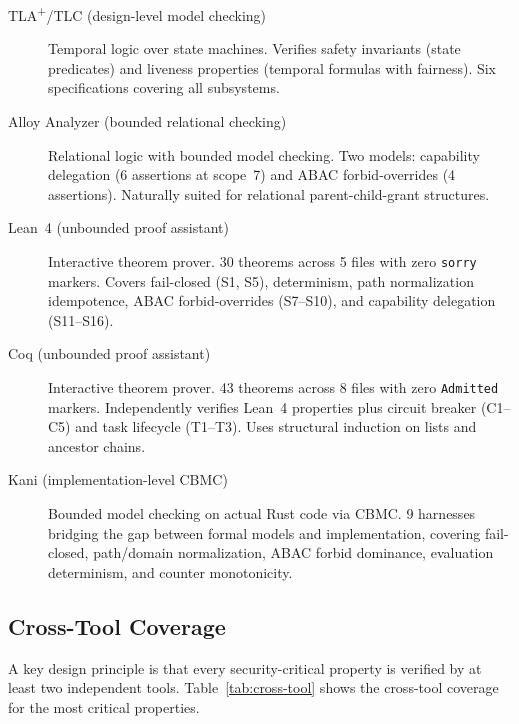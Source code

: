 \documentclass[sigplan,screen,nonacm]{acmart}
\newcommand{\tlaplus}{TLA\textsuperscript{+}\xspace}
\begin{document}
\begin{description}
  \item[\tlaplus/TLC (design-level model checking)] Temporal logic over
    state machines. Verifies safety invariants (state predicates) and
    liveness properties (temporal formulas with fairness). Six
    specifications covering all subsystems.
  \item[Alloy Analyzer (bounded relational checking)] Relational logic
    with bounded model checking. Two models: capability delegation (6
    assertions at scope~7) and ABAC forbid-overrides (4 assertions).
    Naturally suited for relational parent-child-grant structures.
  \item[Lean~4 (unbounded proof assistant)] Interactive theorem prover.
    30 theorems across 5 files with zero \texttt{sorry} markers. Covers
    fail-closed (S1, S5), determinism, path normalization idempotence,
    ABAC forbid-overrides (S7--S10), and capability delegation (S11--S16).
  \item[Coq (unbounded proof assistant)] Interactive theorem prover.
    43 theorems across 8 files with zero \texttt{Admitted} markers.
    Independently verifies Lean~4 properties plus circuit breaker (C1--C5)
    and task lifecycle (T1--T3). Uses structural induction on lists and
    ancestor chains.
  \item[Kani (implementation-level CBMC)] Bounded model checking on actual
    Rust code via CBMC. 9 harnesses bridging the gap between formal models
    and implementation, covering fail-closed, path/domain normalization,
    ABAC forbid dominance, evaluation determinism, and counter monotonicity.
\end{description}

\subsection{Cross-Tool Coverage}

A key design principle is that every security-critical property is verified
by at least two independent tools. Table~\ref{tab:cross-tool} shows the
cross-tool coverage for the most critical properties.
\end{document}
